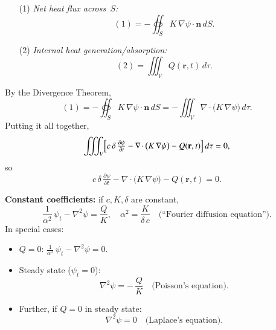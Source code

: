 \documentclass{report}
\begin{document}
\begin{enumerate}
  \item[(1)] \emph{Net heat flux across~$S$:}
  \[
    (1)
    = -\oiint_S K\,\nabla\psi\!\cdot\!\mathbf n\,dS.
  \]
  \begin{center}
  \end{center}

  \item[(2)] \emph{Internal heat generation/absorption:}
  \[
    (2)
    = \iiint_V Q(\mathbf r, t)\,d\tau.
  \]
\end{enumerate}

\noindent By the Divergence Theorem,
\[
(1)
= -\oiint_S K\,\nabla\psi\!\cdot\!\mathbf n\,dS
= -\iiint_V \nabla\!\cdot\bigl(K\,\nabla\psi\bigr)\,d\tau.
\]
Putting it all together,
\[
\iiint_V
\Bigl[
c\,\delta\,\tfrac{\partial\psi}{\partial t}
- \nabla\!\cdot\bigl(K\,\nabla\psi\bigr)
- Q(\mathbf r, t)
\Bigr]
\,d\tau
=0,
\]
so
\[
c\,\delta\,\tfrac{\partial\psi}{\partial t}
- \nabla\!\cdot\bigl(K\,\nabla\psi\bigr)
- Q(\mathbf r, t)
=0.
\]

\medskip
\noindent\textbf{Constant coefficients:} if $c,K,\delta$ are constant,
\[
\frac{1}{\alpha^2}\,\psi_t
- \nabla^2\psi
= \frac{Q}{K},
\quad
\alpha^2 = \frac{K}{\delta\,c}
\quad\text{(``Fourier diffusion equation'').}
\]
In special cases:
\begin{itemize}
  \item $Q=0$: $\displaystyle \frac{1}{\alpha^2}\,\psi_t - \nabla^2\psi = 0.$
  \item Steady state ($\psi_t=0$):
    \[
      \nabla^2\psi = -\,\frac{Q}{K}
      \quad\text{(Poisson's equation).}
    \]
  \item Further, if $Q=0$ in steady state:
    \[
      \nabla^2\psi = 0
      \quad\text{(Laplace's equation).}
    \]
\end{itemize}
\end{document}
